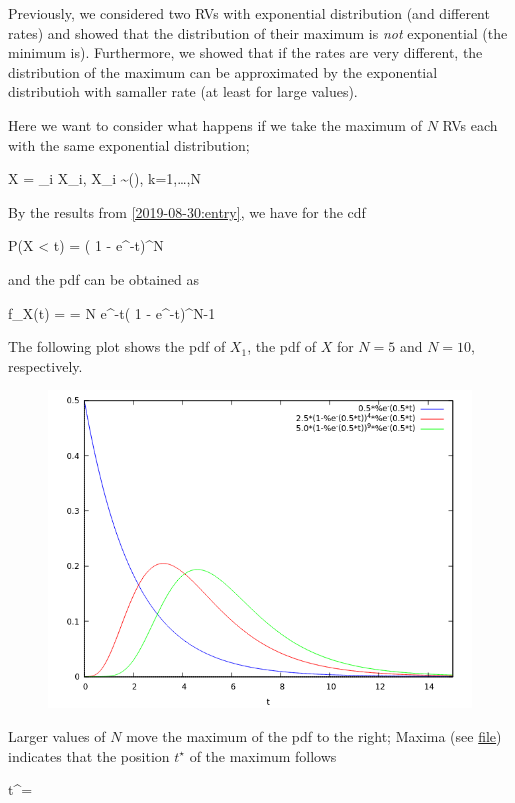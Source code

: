 
Previously, we considered two RVs with exponential distribution (and different rates) and showed that the distribution of their maximum is \emph{not} exponential (the minimum is). Furthermore, we showed that if the rates are very different, the distribution of the maximum can be approximated by the exponential distributioh with samaller rate (at least for large values).

Here we want to consider what happens if we take the maximum of $N$ RVs each with the same exponential distribution; 

\bee
X = \max_i X_i, \quad X_i \sim {}(\lambda), \quad k=1,\ldots,N
\eee

By the results from \ref{2019-08-30:entry}, we have for the cdf

\bee
P(X < t) = \left( 1 - e^{-\lambda t}\right)^N
\eee

and the pdf can be obtained as

\bee
f_X(t) =  = \lambda N e^{-\lambda t}\left( 1 - e^{-\lambda t}\right)^{N-1}
\eee

The following plot shows the pdf of $X_1$, the pdf of $X$ for $N=5$ and $N=10$, respectively.

\begin{figure}[hbt!]
\centering
\includegraphics[scale=0.7]{images/exp_pdf_2_1.png}
\end{figure}

Larger values of $N$ move the maximum of the pdf to the right; Maxima (see \href{files/2019-09-06-exponential_pdf_3.wxmx}{file}) indicates that the position $t^\star$ of the maximum follows

\bee
t^\star = 
\eee




